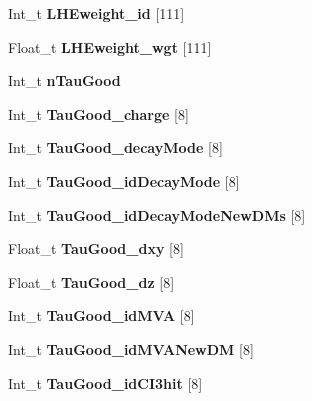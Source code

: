 \begin{DoxyCompactItemize}
Int\+\_\+t {\bfseries L\+H\+Eweight\+\_\+id} \mbox{[}111\mbox{]}
\item 
\hypertarget{classMiniTree_a3b48cc04241bd14049d5b6e9c28fe7b6}{}\label{classMiniTree_a3b48cc04241bd14049d5b6e9c28fe7b6} 
Float\+\_\+t {\bfseries L\+H\+Eweight\+\_\+wgt} \mbox{[}111\mbox{]}
\item 
\hypertarget{classMiniTree_a458d7d7ba1e8b5d1709a29fd30269b71}{}\label{classMiniTree_a458d7d7ba1e8b5d1709a29fd30269b71} 
Int\+\_\+t {\bfseries n\+Tau\+Good}
\item 
\hypertarget{classMiniTree_a7213c8a1023ef67d19aa97e8274c87c4}{}\label{classMiniTree_a7213c8a1023ef67d19aa97e8274c87c4} 
Int\+\_\+t {\bfseries Tau\+Good\+\_\+charge} \mbox{[}8\mbox{]}
\item 
\hypertarget{classMiniTree_a0e03a72a88ae42377701d7389b7abeff}{}\label{classMiniTree_a0e03a72a88ae42377701d7389b7abeff} 
Int\+\_\+t {\bfseries Tau\+Good\+\_\+decay\+Mode} \mbox{[}8\mbox{]}
\item 
\hypertarget{classMiniTree_a4c01cde6985d71efbdc9f26d2dd09065}{}\label{classMiniTree_a4c01cde6985d71efbdc9f26d2dd09065} 
Int\+\_\+t {\bfseries Tau\+Good\+\_\+id\+Decay\+Mode} \mbox{[}8\mbox{]}
\item 
\hypertarget{classMiniTree_a3a6e91357b07b1f345754a34574f099f}{}\label{classMiniTree_a3a6e91357b07b1f345754a34574f099f} 
Int\+\_\+t {\bfseries Tau\+Good\+\_\+id\+Decay\+Mode\+New\+D\+Ms} \mbox{[}8\mbox{]}
\item 
\hypertarget{classMiniTree_ae477a1507270d9eb0ad81f505acf213e}{}\label{classMiniTree_ae477a1507270d9eb0ad81f505acf213e} 
Float\+\_\+t {\bfseries Tau\+Good\+\_\+dxy} \mbox{[}8\mbox{]}
\item 
\hypertarget{classMiniTree_a1325b0bc83ec1c53cef96d830a3a46c6}{}\label{classMiniTree_a1325b0bc83ec1c53cef96d830a3a46c6} 
Float\+\_\+t {\bfseries Tau\+Good\+\_\+dz} \mbox{[}8\mbox{]}
\item 
\hypertarget{classMiniTree_adb9d2f19aaf6b7ba327fd9670241f9fe}{}\label{classMiniTree_adb9d2f19aaf6b7ba327fd9670241f9fe} 
Int\+\_\+t {\bfseries Tau\+Good\+\_\+id\+M\+VA} \mbox{[}8\mbox{]}
\item 
\hypertarget{classMiniTree_a16bb99276f8d2c9adf9ed66a831ab3fa}{}\label{classMiniTree_a16bb99276f8d2c9adf9ed66a831ab3fa} 
Int\+\_\+t {\bfseries Tau\+Good\+\_\+id\+M\+V\+A\+New\+DM} \mbox{[}8\mbox{]}
\item 
\hypertarget{classMiniTree_ac8a612ecc789fcb5b0485f65485f389c}{}\label{classMiniTree_ac8a612ecc789fcb5b0485f65485f389c} 
Int\+\_\+t {\bfseries Tau\+Good\+\_\+id\+C\+I3hit} \mbox{[}8\mbox{]}

\end{DoxyCompactItemize}
